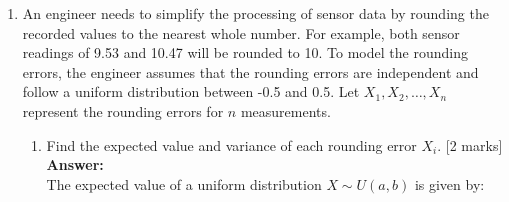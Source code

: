 \documentclass[12pt]{article}
\begin{document}
\begin{enumerate}
\begin{enumerate}
\item{\bf (*STAT7003)} 
Suppose the test is repeated independently $N$ times. Let $N_A$ be the number of times machine A completes the task before machine B. What is the distribution of $N_A$? What is the probability that machine A is faster than machine B in more than half of the $N$ trials?
			\\\phantom{1}\hfill [10 marks]
%
\\
\textbf{Answer:}
\\
The number of times machine A completes the task before machine B in $N$ trials is given by the expression:

\begin{align*}
N_A &= \sum_{i=1}^{N} I_i \\
I_i &= \begin{cases}
1 & \text{if machine A is faster than machine B in trial } i \\
0 & \text{otherwise}
\end{cases}
\end{align*}

Therefore, $N_A$ is the sum of $N$ independent Bernoulli random variables, where each $I_i$ has a success probability of $p$.
The distribution of $N_A$ is given by the binomial distribution with parameters $N$ and $p$:

\begin{align*}
N_A \sim \mathrm{Binomial}(N, p) \\
\end{align*}


\end{enumerate}

\vspace{5pt}
\item An engineer needs to simplify the processing of sensor data by rounding the recorded values to the nearest whole number. For example, both sensor readings of 9.53 and 10.47 will be rounded to 10. To model the rounding errors, the engineer assumes that the rounding errors are independent and follow a uniform distribution between -0.5 and 0.5. Let $X_1, X_2, \ldots, X_n$ represent the rounding errors for $n$ measurements.  

\begin{enumerate}
\item Find the expected value and variance of each rounding error $X_i$.
			\hfill [2 marks]
%
\\
\textbf{Answer:}
\\
The expected value of a uniform distribution $X \sim U(a, b)$ is given by:


\end{enumerate}
\end{enumerate}
\end{document}
